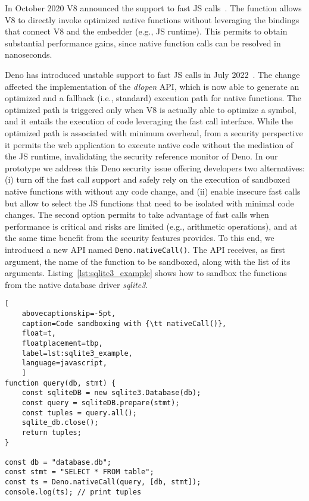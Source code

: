 In October 2020 V8 announced the support to fast JS
calls~\cite{v8-fast-calls}. The function allows V8 to directly invoke optimized native
functions without leveraging the bindings that connect V8 and the
embedder (e.g., JS runtime). This permits to obtain substantial
performance gains, since native function calls can be resolved in
nanoseconds. 

Deno has introduced unstable support to fast JS calls in July
2022~\cite{deno-v1234}. The change affected the implementation of the
{\em dlopen} API, which is now able to generate an optimized and a
fallback (i.e., standard) execution path for native functions. The
optimized path is triggered only when V8 is actually able to optimize
a symbol, and it entails the execution of code leveraging the fast
call interface. While the optimized path is associated with minimum
overhead, from a security perspective it permits the web application
to execute native code without the mediation of the JS runtime,
invalidating the security reference monitor of Deno.
%
In our prototype we address this Deno security issue offering
developers two alternatives: (i) turn off
the fast call support and safely rely on the execution of sandboxed
native functions with \pap without any code change, and (ii) enable insecure fast calls but
allow to select the JS functions that need to be isolated with minimal code changes. The second
option permits to take advantage of fast calls when performance is
critical and risks are limited (e.g., arithmetic operations), and at
the same time benefit from the security features \pap provides. To
this end, we introduced a new API named {\tt Deno.nativeCall()}. The API receives, as first argument, the name of the function
to be sandboxed, along with the list of its arguments.
Listing~\ref{lst:sqlite3_example} shows how to sandbox the functions
from the native database driver {\em sqlite3}.
%
\begin{lstlisting}[
	abovecaptionskip=-5pt,
	caption=Code sandboxing with {\tt nativeCall()},
	float=t,
	floatplacement=tbp,
	label=lst:sqlite3_example,
	language=javascript,
	]
function query(db, stmt) {
    const sqliteDB = new sqlite3.Database(db);
    const query = sqliteDB.prepare(stmt);
    const tuples = query.all();
    sqlite_db.close();
    return tuples;
}

const db = "database.db";  
const stmt = "SELECT * FROM table";
const ts = Deno.nativeCall(query, [db, stmt]);
console.log(ts); // print tuples
\end{lstlisting}

